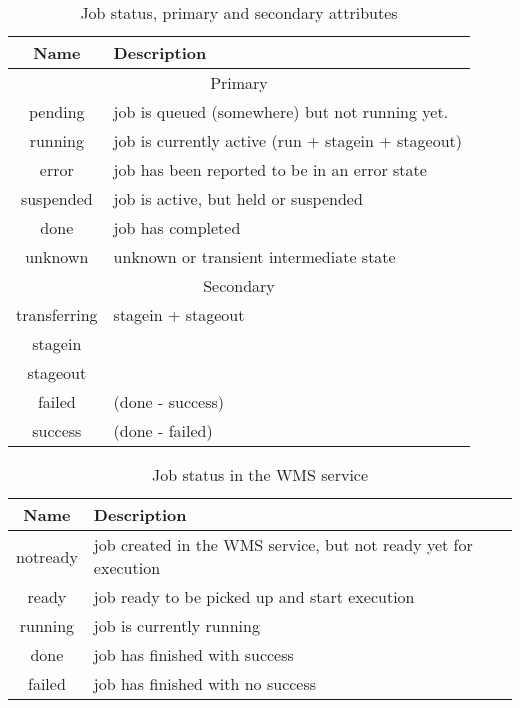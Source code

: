 \documentclass[a4paper]{jpconf}
\begin{document}
\begin{table}
\begin{tabular}{|c|l|}
\hline
\hline
Name & Description\tabularnewline
\hline
\hline
\multicolumn{2}{|c|}{Primary} \\
\hline
\hline
pending      &     job is queued (somewhere) but not running yet.      \\ \hline 
running      &     job is currently active (run + stagein + stageout)  \\ \hline
error        &     job has been reported to be in an error state       \\ \hline
suspended    &     job is active, but held or suspended                \\ \hline
done         &     job has completed                                   \\ \hline
unknown      &     unknown or transient intermediate state             \\ \hline
\hline
\hline
\multicolumn{2}{|c|}{Secondary} \\
\hline
\hline
transferring  &     stagein + stageout  \\ \hline
stagein       &                         \\ \hline
stageout      &                         \\ \hline
failed        &     (done - success)    \\ \hline
success       &     (done - failed)     \\ \hline
\end{tabular}\caption{Job status, primary and secondary attributes}
\label{job secondary status}
\end{table}



\begin{table}
\begin{tabular}{|c|l|}
\hline
\hline
Name & Description\tabularnewline
\hline
\hline
notready &     job created in the WMS service, but not ready yet for execution\\ \hline
ready    &     job ready to be picked up and start execution                  \\ \hline
running  &     job is currently running                                       \\ \hline
done     &     job has finished with success                                  \\ \hline
failed   &     job has finished with no success                               \\ \hline
\end{tabular}\caption{Job status in the WMS service}
\label{wms job status}
\end{table}
\end{document}
